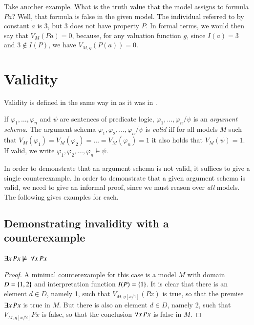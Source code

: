 \documentclass[nobib,nofonts]{tufte-handout}
\newcommand{\proplog}{\acro{PropLog}}
\newcommand{\predlog}{\acro{PredLog}}
\begin{document}
Take another example.
What is the truth value that the model assigns to formula $Pa$?
Well, that formula is false in the given model.
The individual referred to by constant $a$ is 3, but 3 does not have property $P$.
In formal terms, we would then say that $V_{M}(Pa) = 0$, because, for any valuation function $g$, since $I(a) = 3$ and $3 \not \in I(P)$, we have $V_{M,g}(P(a)) = 0$.



\section{Validity}
\label{sec:validity}

Validity is defined in the same way in \predlog as it was in \proplog.

If $\varphi_1, \dots, \varphi_n$ and $\psi$ are sentences of predicate logic, $\varphi_1, \dots, \varphi_n / \psi$ is an \emph{argument schema}.
The argument schema $\varphi_1, \varphi_2, \dots, \varphi_n / \psi$ is \emph{valid} iff for all models $M$ such that $V_M(\varphi_1)=V_M(\varphi_2)= \dots = V_M(\varphi_n)=1$ it also holds that $V_M(\psi) = 1$.
If valid, we write $\varphi_1, \varphi_2, \dots, \varphi_n \models \psi$.

In order to demonstrate that an argument schema is not valid, it suffices to give a single counterexample.
In order to demonstrate that a given argument schema is valid, we need to give an informal proof, since we must reason over \emph{all} models. %
The following gives examples for each.


\subsection{Demonstrating invalidity with a counterexample}
\label{sec:demonstr-inval-with}

\begin{claim}
 $\exists x \thinspace Px  \not \models \ \forall x \thinspace Px$
\end{claim}
\begin{proof}
A minimal counterexample for this case is a model $M$ with domain $D = \left\{1,2\right\}$ and interpretation function $I(P) = \left\{1\right\}$.
It is clear that there is an element $d \in D$, namely 1, such that $V_{M,g[x/1]}(Px)$ is true, so that the premise $\exists x \thinspace Px$ is true in $M$.
But there is also an element $d \in D$, namely 2, such that $V_{M, g[x/2]} Px$ is false, so that the conclusion $\forall x \thinspace Px$ is false in $M$.
\end{proof}
\end{document}
